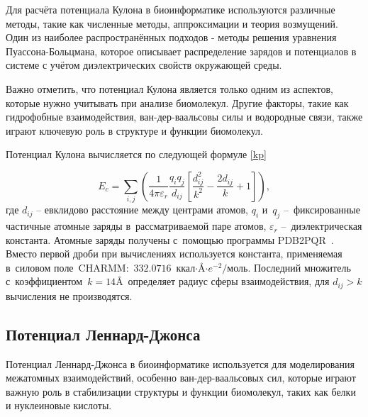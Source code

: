 Для расчёта потенциала Кулона в биоинформатике используются различные методы, такие как численные методы, аппроксимации и теория возмущений. Один из наиболее распространённых подходов - методы решения уравнения Пуассона-Больцмана, которое описывает распределение зарядов и потенциалов в системе с учётом диэлектрических свойств окружающей среды.

Важно отметить, что потенциал Кулона является только одним из аспектов, которые нужно учитывать при анализе биомолекул. Другие факторы, такие как гидрофобные взаимодействия, ван-дер-ваальсовы силы и водородные связи, также играют ключевую роль в структуре и функции биомолекул.

Потенциал Кулона вычисляется по следующей формуле \ref{kp} 

\begin{equation}
	E_{c}=\sum_{i,j}\left({\frac{1}{4 \pi \varepsilon_{r}}} \frac{q_{i}q_{j}}{d_{ij}} \left[ \frac{d^{2}_{ij}}{k^{2}} - \frac{2 d_{ij}}{k} + 1 \right]\right),
	\label{kp}
\end{equation}
где $d_{ij}$ -- евклидово расстояние между центрами атомов, $q_{i}$ и~$q_{j}$ --~фиксированные частичные атомные заряды в~рассматриваемой паре атомов, $\varepsilon_{r}$ --~диэлектрическая константа. Атомные заряды получены с~помощью программы PDB2PQR~\cite{pdb2pqr}. Вместо первой дроби при вычислениях используется константа, применяемая в~силовом поле~CHARMM:~$332.0716$~ккал${\cdot}$\AA${\cdot}e^{-2}/$моль. Последний множитель с~коэффициентом~$k=14$\AA \ определяет радиус сферы взаимодействия, для $d_{ij} > k$ вычисления не производятся.












\subsection{Потенциал Леннард-Джонса}

Потенциал Леннард-Джонса в биоинформатике используется для моделирования межатомных взаимодействий, особенно ван-дер-ваальсовых сил, которые играют важную роль в стабилизации структуры и функции биомолекул, таких как белки и нуклеиновые кислоты.

